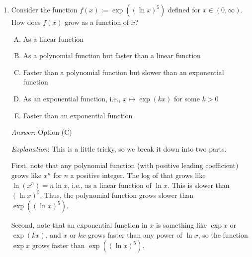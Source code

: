 \documentclass[10pt]{amsart}
\begin{document}
\begin{enumerate}
  \begin{enumerate}[(A)]
  \item As a linear function
  \item As a polynomial function but faster than a linear function
  \item Faster than a polynomial function but slower than an
    exponential function
  \item As an exponential function, i.e., $x \mapsto \exp(kx)$ for some $k > 0$
  \item Faster than an exponential function
  \end{enumerate}

  {\em Answer}: Option (A)

  {\em Explanation}: $\ln((\exp x)^5) = \ln(\exp (5x)) = 5x$ is a
  linear function of $x$.

  {\em Performance review}: $10$ people got this correct. $1$ chose
  (C).

\item Consider the function $f(x) := \exp((\ln x)^5)$ defined for $x \in
  (0,\infty)$. How does $f(x)$ grow as a function of $x$?

  \begin{enumerate}[(A)]
  \item As a linear function
  \item As a polynomial function but faster than a linear function
  \item Faster than a polynomial function but slower than an
    exponential function
  \item As an exponential function, i.e., $x \mapsto \exp(kx)$ for some $k > 0$
  \item Faster than an exponential function
  \end{enumerate}

  {\em Answer}: Option (C)

  {\em Explanation}: This is a little tricky, so we break it down into
  two parts.

  First, note that any polynomial function (with positive leading
  coefficient) grows like $x^n$ for $n$ a positive integer. The log of
  that grows like $\ln(x^n) = n \ln x$, i.e., as a linear function of
  $\ln x$. This is slower than $(\ln x)^5$. Thus, the polynomial
  function grows slower than $\exp((\ln x)^5)$.

  Second, note that an exponential function in $x$ is something like
  $\exp x$ or $\exp(kx)$, and $x$ or $kx$ grows faster than any power
  of $\ln x$, so the function $\exp x$ grows faster than $\exp((\ln
  x)^5)$.


\end{enumerate}
\end{document}

